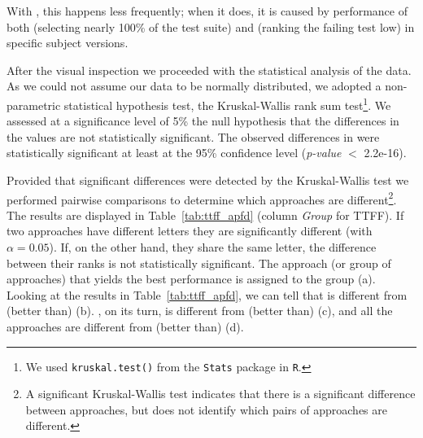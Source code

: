 With \fz, this happens less frequently; when it does, it is caused by performance of both \ek (selecting nearly 100\% of the test suite) and \fs (ranking the failing test low) in specific subject versions.

After the visual inspection we proceeded with the statistical analysis of the data. 
As we could not assume our data to be normally distributed, we adopted a non-parametric statistical hypothesis test, 
the Kruskal-Wallis rank sum test\footnote{We used \texttt{kruskal.test()} from the \texttt{Stats} package in \texttt{R}.}.
We assessed at a significance level of 5\% the null hypothesis that the differences in the \ttff values are not statistically significant.
The observed differences in \ttff were statistically significant at least at the 95\% confidence level 
(\textit{p-value} $<$ 2.2e-16).

Provided that significant differences were detected by the
Kruskal-Wallis test we performed pairwise comparisons to
determine which approaches are different\footnote{A significant Kruskal-Wallis test indicates that 
there is a significant difference between approaches, 
but does not identify which pairs of approaches are different.}. 
The results are displayed in Table~\ref{tab:ttff_apfd} (column \textit{Group} for TTFF).
If two approaches have different letters they are significantly different
(with $\alpha = 0.05$). If, on the other hand, they share the same letter, the
difference between their ranks is not statistically significant. 
The approach (or group of approaches) that yields the best performance is
assigned to the group (a).
Looking at the results in Table~\ref{tab:ttff_apfd}, we can tell that
\fz is different from (better than) \ekr (b).
\ekr, on its turn, is different from (better than) \fs (c), 
and all the approaches are different from (better than) \rnd (d).

%
%
%

